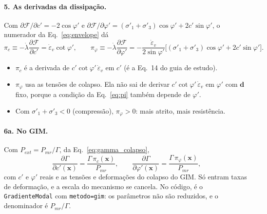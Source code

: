 \documentclass[11pt,a4paper]{article}
\newcommand{\Fy}{\mathcal{F}}
\begin{document}
\paragraph{5. As derivadas da dissipação.} Com $\partial\Fy/\partial c' = -2\cos\varphi'$ e
$\partial\Fy/\partial\varphi' = (\sigma'_1 + \sigma'_3)\cos\varphi' + 2c'\sin\varphi'$, o numerador da
Eq.~\eqref{eq:envelope} dá
\begin{equation}
  \pi_c \equiv -\dot\lambda\frac{\partial\Fy}{\partial c'} = \dot\varepsilon_v\cot\varphi', \qquad
  \pi_\varphi \equiv -\dot\lambda\frac{\partial\Fy}{\partial\varphi'} =
  -\frac{\dot\varepsilon_v}{2\sin\varphi'}\big[(\sigma'_1 + \sigma'_3)\cos\varphi' + 2c'\sin\varphi'\big].
  \label{eq:pis}
\end{equation}
\begin{itemize}
  \item $\pi_c$ é a derivada de $c'\cot\varphi'\,\dot\varepsilon_v$ em $c'$ (é a Eq.~14 do guia de estudo).
  \item $\pi_\varphi$ usa as tensões de colapso. Ela não sai de derivar $c'\cot\varphi'\,\dot\varepsilon_v$ em
    $\varphi'$ com $\bm d$ fixo, porque a condição da Eq.~\eqref{eq:pi} também depende de $\varphi'$.
  \item Com $\sigma'_1 + \sigma'_3 < 0$ (compressão), $\pi_\varphi > 0$: mais atrito, mais resistência.
\end{itemize}

\paragraph{6a. No GIM.} Com $P_{ext} = P_{mr}/\Gamma$, da Eq.~\eqref{eq:gamma_colapso},
\begin{equation}
  \frac{\partial\Gamma}{\partial c'(\bm x)} = \frac{\Gamma\,\pi_c(\bm x)}{P_{mr}}, \qquad
  \frac{\partial\Gamma}{\partial\varphi'(\bm x)} = \frac{\Gamma\,\pi_\varphi(\bm x)}{P_{mr}},
  \label{eq:dgim}
\end{equation}
com $c'$ e $\varphi'$ reais e as tensões e deformações do colapso do GIM. Só entram taxas de deformação, e a escala do
mecanismo se cancela. No código, é o \texttt{GradienteModal} com \texttt{metodo=gim}: os parâmetros não são reduzidos, e
o denominador é $P_{mr}/\Gamma$.
\end{document}
